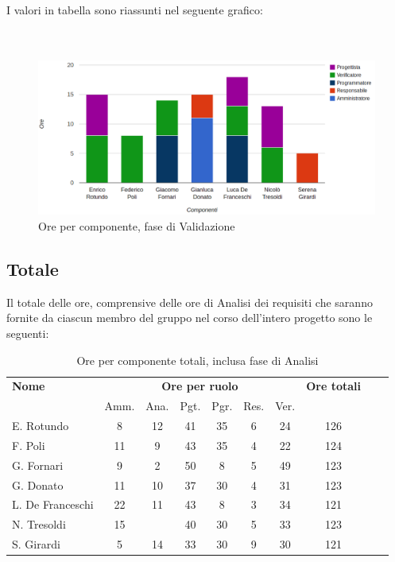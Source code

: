 I valori in tabella sono riassunti nel seguente grafico: \\ \\ \\

\begin{figure}[H]
\centering
\includegraphics[scale=0.35]{4-4.png}
\caption{Ore per componente, fase di Validazione\label{fig:nome}}
\end{figure}

\pagebreak
\subsection{Totale}

Il totale delle ore, comprensive delle ore di Analisi dei requisiti che saranno fornite da ciascun membro del gruppo nel corso dell'intero progetto sono le seguenti:

\begin{table}[H]
\centering
\begin{tabular}{lccccccccc}
\toprule 
    \textbf{Nome}  & \multicolumn{6}{c}{\textbf{Ore per ruolo}} & \textbf{Ore totali}\\
     & Amm. & Ana. & Pgt. & Pgr. & Res. & Ver. \\
    \midrule
    E. Rotundo   	& 8 & 12& 41 & 35 & 6 & 24 & 126 \\
    F. Poli  		& 11	& 9 & 43 & 35 & 4 & 22 & 124 \\
    G. Fornari		& 9	& 2 & 50 & 8  & 5 & 49 & 123 \\
    G. Donato 		& 11	& 10& 37 & 30 & 4 & 31 & 123 \\
    L. De Franceschi 	& 22	& 11& 43 & 8  & 3 & 34 & 121 \\
    N. Tresoldi 		& 15	&   & 40 & 30 & 5 & 33 & 123 \\
    S. Girardi 		& 5	& 14& 33 & 30 & 9 & 30 & 121 \\
    
    \bottomrule
\end{tabular}
\caption{Ore per componente totali, inclusa fase di Analisi}
\end{table}

